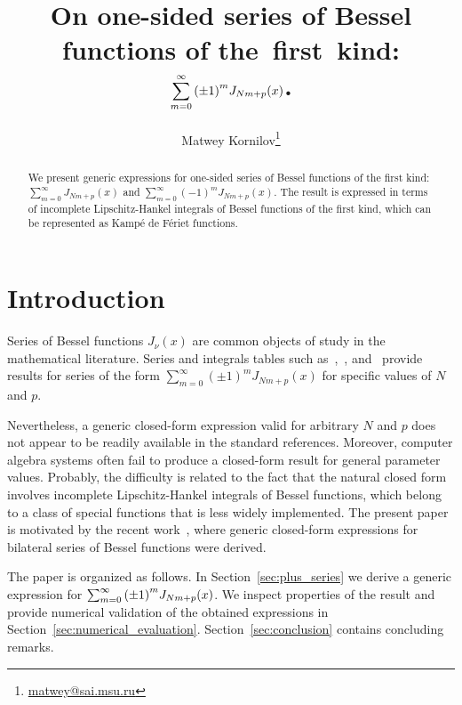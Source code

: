 \documentclass{article}
\title{On one-sided series of Bessel functions of the~first~kind:\\
$\displaystyle\sum_{m=0}^{\infty} \qty(\pm 1)^m J_{Nm+p}(x)$.
}
\author[1,2]{Matwey Kornilov\footnote{\protect\url{matwey@sai.msu.ru}}}
\affil[1]{Lomonosov Moscow State University}
\affil[2]{HSE University}
\date{}
\begin{document}
\newcommand{\JC}[1]{\ifthenelse{\equal{#1}{0}}
    {\ensuremath{J_{c_{0}}}}
    {\ensuremath{J_{c_{0,#1}}}}
}
\newcommand{\JS}[1]{\ifthenelse{\equal{#1}{0}}
    {\ensuremath{J_{s_{0}}}}
    {\ensuremath{J_{s_{0,#1}}}}
}


\maketitle

\begin{abstract}
We present generic expressions for one-sided series of Bessel functions of the first kind:
$\displaystyle\sum_{m=0}^{\infty} J_{Nm+p}(x)$ and $\displaystyle\sum_{m=0}^{\infty} (-1)^m J_{Nm+p}(x)$.
The result is expressed in terms of incomplete Lipschitz-Hankel integrals of Bessel functions of the first kind, which can be represented as Kamp\'e de F\'eriet functions.
\end{abstract}

\section{Introduction}

Series of Bessel functions $J_{\nu}(x)$ are common objects of study in the mathematical literature.
Series and integrals tables such as~\cite{Gradshteyn2014},~\cite{Abramowitz1965}, and~\cite{Prudnikov1986} provide results for series of the form $\sum_{m=0}^{\infty} (\pm 1)^m J_{Nm+p}(x)$ for specific values of $N$ and $p$.

Nevertheless, a generic closed-form expression valid for arbitrary $N$ and $p$ does not appear to be readily available in the standard references.
Moreover, computer algebra systems often fail to produce a closed-form result for general parameter values.
Probably, the difficulty is related to the fact that the natural closed form involves incomplete Lipschitz-Hankel integrals of Bessel functions, which belong to a class of special functions that is less widely implemented.
The present paper is motivated by the recent work~\cite{Sung2022}, where generic closed-form expressions for bilateral series of Bessel functions were derived.

The paper is organized as follows.
In Section~\ref{sec:plus_series} we derive a generic expression for $\sum_{m=0}^{\infty} \qty(\pm 1)^m J_{Nm+p}(x)$.
We inspect properties of the result and provide numerical validation of the obtained expressions in Section~\ref{sec:numerical_evaluation}.
Section~\ref{sec:conclusion} contains concluding remarks.
\end{document}
